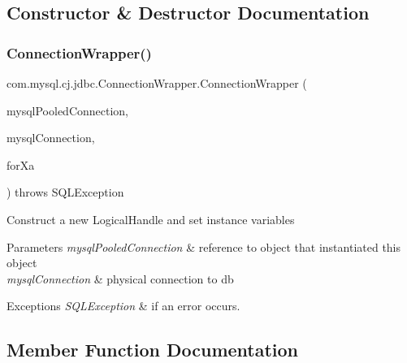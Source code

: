 \subsection{Constructor \& Destructor Documentation}
\mbox{\label{classcom_1_1mysql_1_1cj_1_1jdbc_1_1_connection_wrapper_a6dbecfe42d98fb8c3f0ff7081ccc07cf}} 
\subsubsection{\texorpdfstring{Connection\+Wrapper()}{ConnectionWrapper()}}
{\footnotesize\ttfamily com.\+mysql.\+cj.\+jdbc.\+Connection\+Wrapper.\+Connection\+Wrapper (\begin{DoxyParamCaption}\item[{\mbox{\hyperlink{classcom_1_1mysql_1_1cj_1_1jdbc_1_1_mysql_pooled_connection}{Mysql\+Pooled\+Connection}}}]{mysql\+Pooled\+Connection,  }\item[{\mbox{\hyperlink{interfacecom_1_1mysql_1_1cj_1_1jdbc_1_1_jdbc_connection}{Jdbc\+Connection}}}]{mysql\+Connection,  }\item[{boolean}]{for\+Xa }\end{DoxyParamCaption}) throws S\+Q\+L\+Exception}

Construct a new Logical\+Handle and set instance variables


\begin{DoxyParams}{Parameters}
{\em mysql\+Pooled\+Connection} & reference to object that instantiated this object \\
\hline
{\em mysql\+Connection} & physical connection to db\\
\hline
\end{DoxyParams}

\begin{DoxyExceptions}{Exceptions}
{\em S\+Q\+L\+Exception} & if an error occurs. \\
\hline
\end{DoxyExceptions}


\subsection{Member Function Documentation}
\mbox{\label{classcom_1_1mysql_1_1cj_1_1jdbc_1_1_connection_wrapper_a326d50e31598342bcc2c4273967f3020}} 
